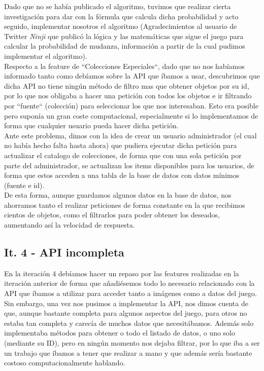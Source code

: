Dado que no se había publicado el algoritmo, tuvimos que realizar cierta investigación para dar con la fórmula que calcula dicha probabilidad y acto seguido, implementar nosotros el algoritmo (Agradecimientos al usuario de Twitter \textit{Ninji} que publicó la lógica y las matemáticas que sigue el juego para calcular la probabilidad de mudanza, información a partir de la cual pudimos implementar el algoritmo).\\

Respecto a la feature de ``Colecciones Especiales``, dado que no nos habíamos informado tanto como debíamos sobre la API que íbamos a usar, descubrimos que dicha API no tiene ningún método de filtro mas que obtener objetos por su id, por lo que nos obligaba a hacer una petición con todos los objetos e ir filtrando por ``fuente`` (colección) para seleccionar los que nos interesaban. Esto era posible pero suponía un gran coste computacional, especialmente si lo implementamos de forma que cualquier usuario pueda hacer dicha petición.\\

Ante este problema, dimos con la idea de crear un usuario administrador (el cual no había hecho falta hasta ahora) que pudiera ejecutar dicha petición para actualizar el catalogo de colecciones, de forma que con una sola petición por parte del administrador, se actualizan los items disponibles para los usuarios, de forma que estos acceden a una tabla de la base de datos con datos mínimos (fuente e id).\\

De esta forma, aunque guardamos algunos datos en la base de datos, nos ahorramos tanto el realizar peticiones de forma constante en la que recibimos cientos de objetos, como el filtrarlos para poder obtener los deseados, aumentando así la velocidad de respuesta.

\subsection{It. 4 - API incompleta}

En la iteración 4 debíamos hacer un repaso por las features realizadas en la iteración anterior de forma que añadiésemos todo lo necesario relacionado con la API \citep{acnhapi} que íbamos a utilizar para acceder tanto a imágenes como a datos del juego.\\

Sin embargo, una vez nos pusimos a implementar la API, nos dimos cuenta de que, aunque bastante completa para algunos aspectos del juego, para otros no estaba tan completa y carecía de muchos datos que necesitábamos. Además solo implementaba métodos para obtener o todo el listado de datos, o uno solo (mediante su ID), pero en ningún momento nos dejaba filtrar, por lo que iba a ser un trabajo que íbamos a tener que realizar a mano y que además sería bastante costoso computacionalmente hablando.\\

